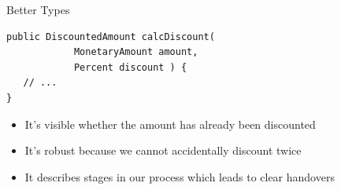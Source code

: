 \begin{frame}[fragile]{Better Types}

\begin{lstlisting}
public DiscountedAmount calcDiscount(
			MonetaryAmount amount,
			Percent discount ) {
   // ...
}
\end{lstlisting}

\end{frame}


\begin{frame}[fragile]{\de{}}

\begin{itemize}
\item It's visible whether the amount has already been discounted
\item It's robust because we cannot accidentally discount twice
\item It describes stages in our process which leads to clear handovers
\end{itemize}

\end{frame}


